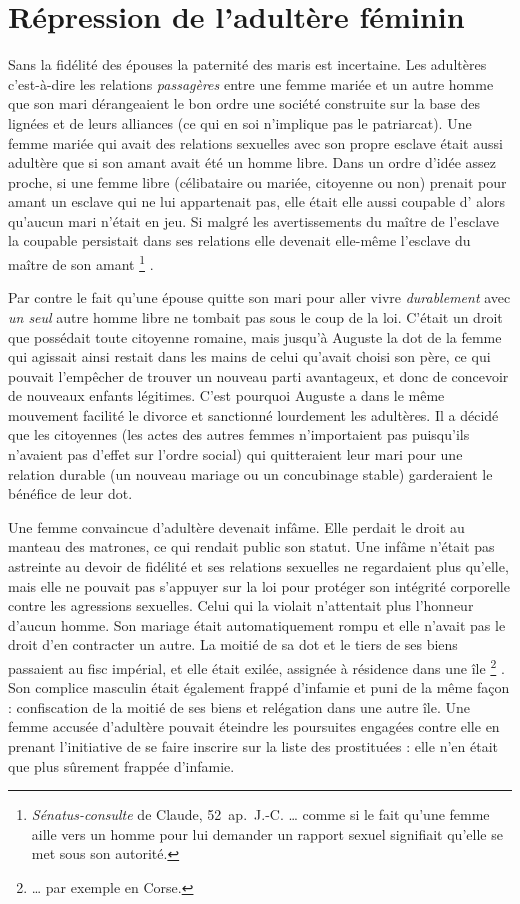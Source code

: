 \section{Répression de l'adultère féminin}

 Sans la fidélité des épouses la paternité des maris est incertaine. Les adultères c'est-à-dire les relations \emph{passagères} entre une femme mariée et un autre homme que son mari dérangeaient le bon ordre une société construite sur la base des lignées et de leurs alliances (ce qui en soi n'implique pas le patriarcat). Une femme mariée qui avait des relations sexuelles avec son propre esclave était aussi adultère que si son amant avait été un homme libre. Dans un ordre d'idée assez proche, si une femme libre (célibataire ou mariée, citoyenne ou non) prenait pour amant un esclave qui ne lui appartenait pas, elle était elle aussi coupable d' alors qu'aucun mari n'était en jeu. Si malgré les avertissements du maître de l'esclave la coupable persistait dans ses relations elle devenait elle-même l'esclave du maître de son amant%
\footnote{\emph{Sénatus-consulte} de Claude, \mbox{52 ap. J.-C.} … comme si le fait qu'une femme aille vers un homme pour lui demander un rapport sexuel signifiait qu'elle se met sous son autorité.}%
.

 Par contre le fait qu'une épouse quitte son mari pour aller vivre \emph{durablement} avec \emph{un seul} autre homme libre ne tombait pas sous le coup de la loi. C'était un droit que possédait toute citoyenne romaine, mais jusqu'à Auguste la dot de la femme qui agissait ainsi restait dans les mains de celui qu'avait choisi son père, ce qui pouvait l'empêcher de trouver un nouveau parti avantageux, et donc de concevoir de nouveaux enfants légitimes. C'est pourquoi Auguste a dans le même mouvement facilité le divorce et sanctionné lourdement les adultères. Il a décidé que les citoyennes (les actes des autres femmes n'importaient pas puisqu'ils n'avaient pas d'effet sur l'ordre social) qui quitteraient leur mari pour une relation durable (un nouveau mariage ou un concubinage stable) garderaient le bénéfice de leur dot. 

 Une femme convaincue d'adultère devenait infâme. Elle perdait le droit au manteau des matrones, ce qui rendait public son statut. Une infâme n'était pas astreinte au devoir de fidélité et ses relations sexuelles ne regardaient plus qu'elle, mais elle ne pouvait pas s'appuyer sur la loi pour protéger son intégrité corporelle contre les agressions sexuelles. Celui qui la violait n'attentait plus l'honneur d'aucun homme. Son mariage était automatiquement rompu et elle n'avait pas le droit d'en contracter un autre. La moitié de sa dot et le tiers de ses biens passaient au fisc impérial, et elle était exilée, assignée à résidence dans une île%
\footnote{… par exemple en Corse.}%
. Son complice masculin était également frappé d'infamie et puni de la même façon : confiscation de la moitié de ses biens et relégation dans une autre île. Une femme accusée d'adultère pouvait éteindre les poursuites engagées contre elle en prenant l'initiative de se faire inscrire sur la liste des prostituées : elle n'en était que plus sûrement frappée d'infamie. 

